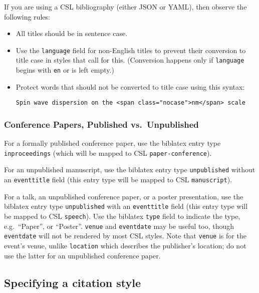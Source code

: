 \documentclass[]{article}
\begin{document}
If you are using a CSL bibliography (either JSON or YAML), then observe
the following rules:

\begin{itemize}
\item
  All titles should be in sentence case.
\item
  Use the \texttt{language} field for non-English titles to prevent
  their conversion to title case in styles that call for this.
  (Conversion happens only if \texttt{language} begins with \texttt{en}
  or is left empty.)
\item
  Protect words that should not be converted to title case using this
  syntax:

\begin{verbatim}
Spin wave dispersion on the <span class="nocase">nm</span> scale
\end{verbatim}
\end{itemize}

\hypertarget{conference-papers-published-vs.-unpublished}{%
\subsubsection{Conference Papers, Published
vs.~Unpublished}\label{conference-papers-published-vs.-unpublished}}

For a formally published conference paper, use the biblatex entry type
\texttt{inproceedings} (which will be mapped to CSL
\texttt{paper-conference}).

For an unpublished manuscript, use the biblatex entry type
\texttt{unpublished} without an \texttt{eventtitle} field (this entry
type will be mapped to CSL \texttt{manuscript}).

For a talk, an unpublished conference paper, or a poster presentation,
use the biblatex entry type \texttt{unpublished} with an
\texttt{eventtitle} field (this entry type will be mapped to CSL
\texttt{speech}). Use the biblatex \texttt{type} field to indicate the
type, e.g.~``Paper'', or ``Poster''. \texttt{venue} and
\texttt{eventdate} may be useful too, though \texttt{eventdate} will not
be rendered by most CSL styles. Note that \texttt{venue} is for the
event's venue, unlike \texttt{location} which describes the publisher's
location; do not use the latter for an unpublished conference paper.

\hypertarget{specifying-a-citation-style}{%
\subsection{Specifying a citation
style}\label{specifying-a-citation-style}}
\end{document}
